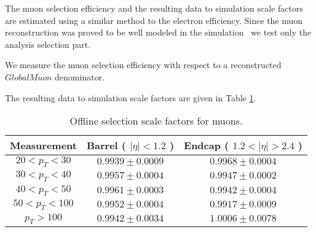 
The muon selection efficiency and the resulting data to simulation
scale factors are estimated using a similar method to the electron efficiency.
Since the muon reconstruction was proved to be well modeled in the simulation~\cite{VBTFCrossSectionNote}
we test only the analysis selection part.

We measure the muon selection efficiency with respect to a reconstructed $GlobalMuon$
denominator.

The resulting data to simulation scale factors are given in Table \ref{tab:eff_mu_offline}.

\begin{table}[!ht]
\begin{center}
\begin{tabular}{c|c|c}
\hline
Measurement & Barrel ( $|\eta|<1.2$ )   & Endcap ( $1.2<|\eta|>2.4$ )  \\ 
\hline
$20 < p_T < 30$  & $0.9939 \pm 0.0009$ & $0.9968 \pm 0.0004$  \\ \hline
$30 < p_T < 40$  & $0.9957 \pm 0.0004$ & $0.9947 \pm 0.0002$  \\ \hline
$40 < p_T < 50$  & $0.9961 \pm 0.0003$ & $0.9942 \pm 0.0004$  \\ \hline
$50 < p_T < 100$ & $0.9952 \pm 0.0004$ & $0.9917 \pm 0.0009$  \\ \hline
$p_T > 100$      & $0.9942 \pm 0.0034$ & $1.0006 \pm 0.0078$  \\ \hline 
\end{tabular}
\caption{Offline selection scale factors for muons.}
\label{tab:eff_mu_offline}
\end{center}
\end{table}

